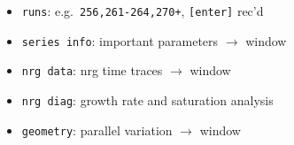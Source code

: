 \documentclass[10pt]{beamer}
\begin{document}
{\begin{frame}[fragile]
\begin{block}{}
\begin{itemize}
\item \verb|runs|: e.g.~\verb|256,261-264,270+|, \verb|[enter]| rec'd
\item \verb|series info|: important parameters $\rightarrow$ window
\item \verb|nrg data|: nrg time traces $\rightarrow$ window
\item \verb|nrg diag|: growth rate and saturation analysis
\item \verb|geometry|: parallel variation $\rightarrow$ window
\end{itemize}
\end{block}

\end{frame}


\begin{frame}[fragile]
  \frametitle{}%

\vspace{-0.2cm}  


\end{frame}}
\end{document}
